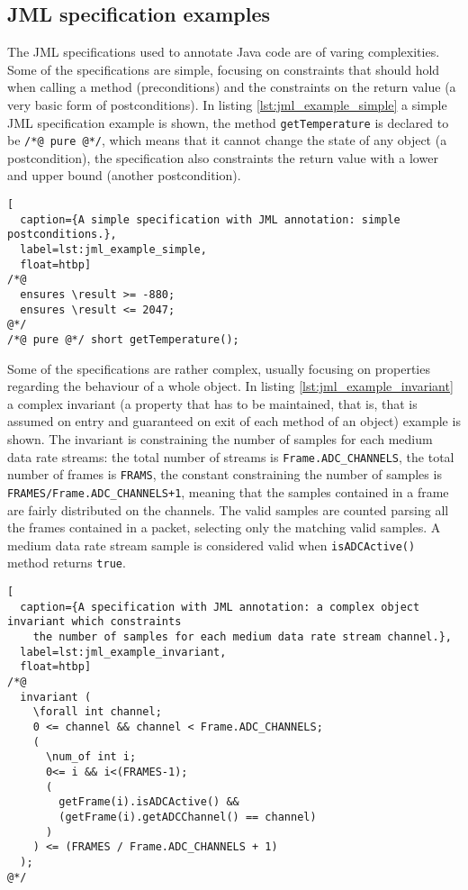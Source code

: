 \documentclass{article}
\newcommand{\lil}[1]{\texttt{\lstinline|#1|}}
\begin{document}
\subsection{JML specification examples}
\label{subsec:a_jml_specification_example}

The JML specifications used to annotate Java code are of varing complexities.
Some of the specifications are simple, focusing on constraints that should hold when 
calling a method (preconditions) and the constraints on the return value (a very basic form of 
postconditions).
In listing \ref{lst:jml_example_simple} a simple JML specification example is shown, the 
method \lil{getTemperature} is declared to be \lil{/*@ pure @*/}, which means that 
it cannot change the state of any object (a postcondition), the specification also constraints 
the return value with a lower and upper bound (another postcondition).

\begin{lstlisting}[
  caption={A simple specification with JML annotation: simple postconditions.},
  label=lst:jml_example_simple,
  float=htbp]
/*@ 
  ensures \result >= -880;
  ensures \result <= 2047;
@*/
/*@ pure @*/ short getTemperature();
\end{lstlisting}

\sloppy

Some of the specifications are rather complex, usually focusing on properties regarding the 
behaviour of a whole object.
In listing \ref{lst:jml_example_invariant} a complex invariant 
(a property that has to be maintained, that is, that is assumed on entry and guaranteed on 
exit of each method of an object)
example is shown. 
The invariant is constraining the number of samples for each medium data rate streams: 
the total number of streams is \lil{Frame.ADC_CHANNELS}, the total number of frames is 
\lil{FRAMS}, the constant constraining the number of samples is 
\lil{FRAMES/Frame.ADC_CHANNELS+1}, meaning that the samples contained in a frame are
fairly distributed on the channels. 
The valid samples are counted parsing all the frames contained in a packet, selecting only 
the matching valid samples.
A medium data rate stream sample is considered valid when \lil{isADCActive()} method 
returns \lil{true}.

\fussy

\begin{lstlisting}[
  caption={A specification with JML annotation: a complex object invariant which constraints 
    the number of samples for each medium data rate stream channel.},
  label=lst:jml_example_invariant,
  float=htbp]
/*@ 
  invariant (
    \forall int channel;
    0 <= channel && channel < Frame.ADC_CHANNELS; 
    (
      \num_of int i;
      0<= i && i<(FRAMES-1);
      (
        getFrame(i).isADCActive() &&
        (getFrame(i).getADCChannel() == channel)
      )
    ) <= (FRAMES / Frame.ADC_CHANNELS + 1)
  );
@*/
\end{lstlisting}
\end{document}
